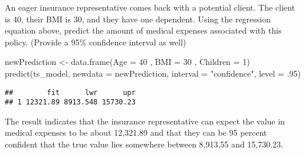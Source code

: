 \documentclass[
]{article}
\newenvironment{Shaded}{\begin{snugshade}}{\end{snugshade}}
\newcommand{\AttributeTok}[1]{\textcolor[rgb]{0.77,0.63,0.00}{#1}}
\newcommand{\DecValTok}[1]{\textcolor[rgb]{0.00,0.00,0.81}{#1}}
\newcommand{\FunctionTok}[1]{\textcolor[rgb]{0.00,0.00,0.00}{#1}}
\newcommand{\NormalTok}[1]{#1}
\newcommand{\OtherTok}[1]{\textcolor[rgb]{0.56,0.35,0.01}{#1}}
\newcommand{\StringTok}[1]{\textcolor[rgb]{0.31,0.60,0.02}{#1}}
\begin{document}
An eager insurance representative comes back with a potential client.
The client is 40, their BMI is 30, and they have one dependent. Using
the regression equation above, predict the amount of medical expenses
associated with this policy. (Provide a 95\% confidence interval as
well)

\begin{Shaded}
\begin{Highlighting}[]
\NormalTok{newPrediction }\OtherTok{\textless{}{-}} \FunctionTok{data.frame}\NormalTok{(}\AttributeTok{Age =} \DecValTok{40}\NormalTok{ , }\AttributeTok{BMI =} \DecValTok{30}\NormalTok{ , }\AttributeTok{Children =} \DecValTok{1}\NormalTok{)}
\FunctionTok{predict}\NormalTok{(ts\_model,}
\AttributeTok{newdata =}\NormalTok{ newPrediction,}
\AttributeTok{interval =} \StringTok{"confidence"}\NormalTok{,}
\AttributeTok{level =}\NormalTok{ .}\DecValTok{95}\NormalTok{)}
\end{Highlighting}
\end{Shaded}

\begin{verbatim}
##        fit      lwr      upr
## 1 12321.89 8913.548 15730.23
\end{verbatim}

The result indicates that the insurance representative can expect the
value in medical expenses to be about 12,321.89 and that they can be 95
percent confident that the true value lies somewhere between 8,913,55
and 15,730.23.
\end{document}
